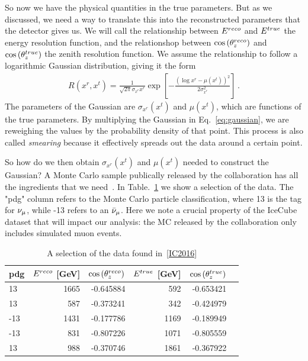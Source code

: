 \documentclass{thesis}
\begin{document}
So now we have the physical quantities in the true parameters. But as we discussed, we need a way to translate this into the reconstructed parameters that the detector gives us. We will call the relationship between 
$E^{reco}$ and $E^{true}$ the energy resolution function, and the relationshop between $\cos{(\theta_z^{reco})}$ and $\cos{(\theta_z^{true})}$ the zenith resolution function. We assume the relationship to follow a logarithmic Gaussian distribution, giving it the form 
\begin{align}\label{eq:gaussian}
    R(x^r, x^t) = \frac{1}{\sqrt{2\pi} \sigma_{x^r}x^r} \exp\left[-\frac{(\log x^r-\mu(x^t))^2}{2\sigma_{x^r}^2}\right]\,.
\end{align}
The parameters of the Gaussian are $\sigma_{x^r}(x^t)$ and $\mu(x^t)$, which are functions of the true parameters. By multiplying the Gaussian in Eq.~\ref{eq:gaussian}, we are reweighing the values by the 
probability density of that point. This process is also called \emph{smearing} because it effectively spreads out the data around a certain point. 

So how do we then obtain $\sigma_{x^r}(x^t)$ and $\mu(x^t)$ needed to construct the Gaussian? A Monte Carlo sample publically released by the 
collaboration has all the ingredients that we need~\cite{IC2016}. In Table.~\ref{table:IC_MC} we show a selection of the data.
The "pdg" column refers to the Monte Carlo particle classification, where 13 is the tag for $\nu_\mu$, while -13 refers
to an $\bar\nu_\mu$. Here we note a crucial property of the IceCube dataset that will impact our analysis: the MC released by the collaboration
only includes simulated muon events.

\begin{table}\label{table:IC_MC}
    \begin{tabular}{lrrrrr}
        \hline \hline
        pdg &      $E^{reco}$ [\si{\GeV}] &     $\cos{(\theta_z^{reco})}$ &       $E^{true}$ [\si{\GeV}] &     $\cos{(\theta_z^{true})}$ \\
        \hline
         13 &  1665 & -0.645884 &    592 & -0.653421 \\
         13 &   587 & -0.373241 &    342 & -0.424979 \\
        -13 &  1431 & -0.177786 &   1169 & -0.189949 \\
        -13 &   831 & -0.807226 &   1071 & -0.805559 \\
         13 &   988 & -0.370746 &   1861 & -0.367922 \\
         \hline
  \end{tabular}
  \caption{A selection of the data found in~\ref{IC2016}}
\end{table}
\end{document}
